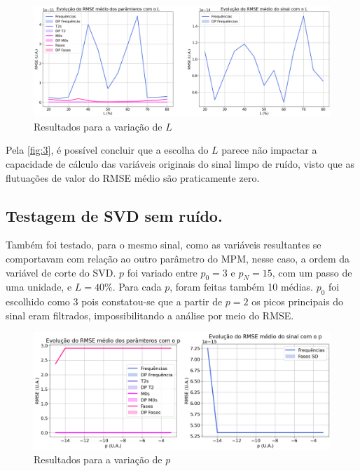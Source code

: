 \documentclass[12pt]{article}
\begin{document}
\begin{figure} [H]
    \centering
    \includegraphics[scale=0.3125]{RMSE-L.png}
    \caption{Resultados para a variação de $L$}
    \label{fig:3}
\end{figure}

Pela \autoref{fig:3}, é possível concluir que a escolha do $L$ parece não impactar a capacidade de cálculo das variáveis originais do sinal 
limpo de ruído, visto que as flutuações de valor do RMSE médio são praticamente zero.

\subsection{Testagem de SVD sem ruído.}

Também foi testado, para o mesmo sinal, como as variáveis resultantes se comportavam com relação ao outro parâmetro do MPM, nesse caso, a 
ordem da variável de corte do SVD. $p$ foi variado entre $p_0 = 3$ e $p_N = 15$, com um passo de uma unidade, e $L = 40\%$. Para cada $p$, foram feitas 
também 10 médias. $p_0$ foi escolhido como 3 pois constatou-se que a partir de $p = 2$ os picos principais do sinal eram filtrados, impossibilitando a 
análise por meio do RMSE.

\begin{figure} [H]
    \centering
    \includegraphics[scale=0.4166]{RMSE-p.png}
    \caption{Resultados para a variação de $p$}
    \label{fig:4}
\end{figure}
\end{document}
